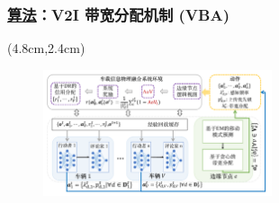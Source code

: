 \begin{frame}
\frametitle{\englishfont \underline{算法}：V2I 带宽分配机制 (VBA)}
\newBackground
\begin{center}
\begin{textblock*}{\textwidth}(4.8cm,2.4cm)
\begin{figure}
\includegraphics[width=0.6\textwidth]{fig/Fig2-4-solution-model.pdf}
\end{figure}
\end{textblock*}
\end{center}


\end{frame}
